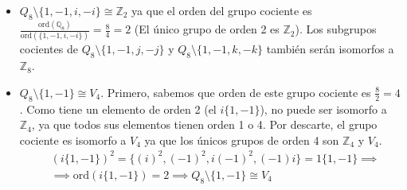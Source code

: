 \documentclass[a4paper,12pt]{article}
\begin{document}
\begin{enumerate}
    \begin{itemize}
        \item $Q_8 \setminus \{1, -1, i, -i\} \cong \mathbb{Z}_2$ ya que el orden del grupo cociente es $\frac{\text{ord}(\mathbb{Q}_8)}{\text{ord}(\{1,-1,i,-i\})} = \frac{8}{4} = 2$ (El único grupo de orden 2 es $\mathbb{Z}_2$).
        Los subgrupos cocientes de $Q_8 \setminus \{1,-1,j,-j\}$ y $Q_8 \setminus \{1,-1,k,-k\}$ también serán isomorfos a $\mathbb{Z}_8$.

        \item $Q_8 \setminus \{1,-1\} \cong V_4$. Primero, sabemos que orden de este grupo cociente es $\frac{8}{2} = 4$. Como tiene un elemento de orden 2 (el $i\{1,-1\}$), no puede ser isomorfo a $\mathbb{Z}_{4}$, ya que todos sus elementos tienen orden 1 o 4. Por descarte, el grupo cociente es isomorfo a $V_4$ ya que los únicos grupos de orden 4 son $\mathbb{Z}_4$ y $V_{4}$. 
        \begin{equation*}
            \begin{split}
                & (i\{1,-1\})^2 = \{(i)^2, (-1)^2, i(-1)^2, (-1)i\} = 1\{1,-1\} \implies\\
                & \implies \text{ord}(i\{1,-1\})=2 \implies Q_8 \setminus \{1,-1\} \cong V_{4}
            \end{split}
        \end{equation*}
    \end{itemize}

\end{enumerate}
\end{document}
